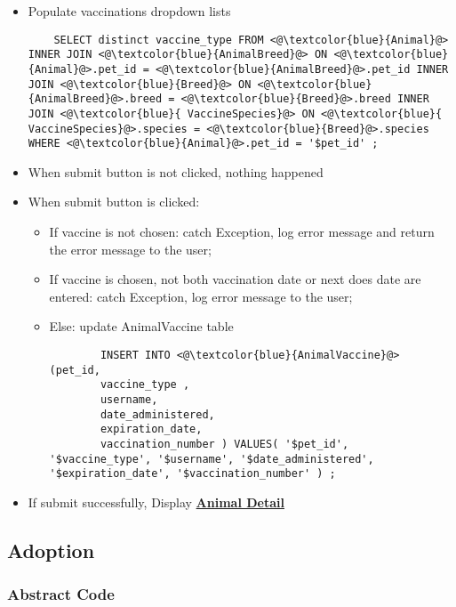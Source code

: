 \documentclass[a4paper]{article}
\begin{document}
\begin{itemize}
	\item Populate vaccinations dropdown lists
	\begin{lstlisting}
	SELECT distinct vaccine_type FROM <@\textcolor{blue}{Animal}@> INNER JOIN <@\textcolor{blue}{AnimalBreed}@> ON <@\textcolor{blue}{Animal}@>.pet_id = <@\textcolor{blue}{AnimalBreed}@>.pet_id INNER JOIN <@\textcolor{blue}{Breed}@> ON <@\textcolor{blue}{AnimalBreed}@>.breed = <@\textcolor{blue}{Breed}@>.breed INNER JOIN <@\textcolor{blue}{ VaccineSpecies}@> ON <@\textcolor{blue}{ VaccineSpecies}@>.species = <@\textcolor{blue}{Breed}@>.species WHERE <@\textcolor{blue}{Animal}@>.pet_id = '$pet_id' ;
	\end{lstlisting}
	\item When submit button is not clicked, nothing happened
	\item When submit button is clicked:
	\begin{itemize}
	    \item If vaccine is not chosen: catch Exception, log error message and return the error message to the user;
	    \item If vaccine is chosen, not both vaccination date or next does date are entered: catch Exception, log error message to the user;
	    \item  Else: update AnimalVaccine table
    	\begin{lstlisting}
    	INSERT INTO <@\textcolor{blue}{AnimalVaccine}@> (pet_id,
        vaccine_type ,
        username,
        date_administered,
        expiration_date,
        vaccination_number ) VALUES( '$pet_id', '$vaccine_type', '$username', '$date_administered', '$expiration_date', '$vaccination_number' ) ;
    	\end{lstlisting}
	 \end{itemize}
	 \item If submit successfully, Display \underline{\textbf{Animal Detail}}
\end{itemize}

\hypertarget{adoption}{\subsection{Adoption}}

\subsubsection*{Abstract Code}
\end{document}
